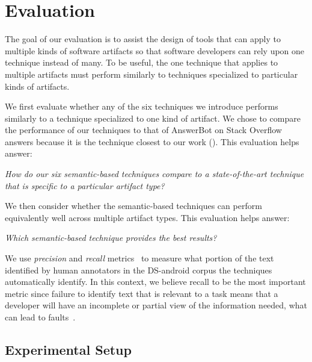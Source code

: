 \clearpage

\section{Evaluation}
\label{cp5:evaluation}



The goal of our evaluation is to assist the design of tools that
can apply to multiple kinds of software artifacts
so that software developers can rely upon
one technique instead of many. To be useful, the one technique
that applies to multiple artifacts must 
perform similarly to techniques specialized
to particular kinds of artifacts.


We first evaluate whether any of the
six techniques we introduce performs
similarly to a technique specialized to one
kind of artifact. We chose to compare
the performance of our techniques to
that of AnswerBot on Stack Overflow
answers because it is the technique closest to our work (). This
evaluation helps answer: 


\medskip
\begin{bluequote}
    \textit{How do our six semantic-based techniques compare to a state-of-the-art technique that is specific to a particular artifact type?} 
\end{bluequote}





We then consider whether the semantic-based
techniques can perform equivalently well across
multiple artifact types.
This evaluation helps answer:

\medskip
\begin{bluequote}
    \textit{Which semantic-based technique provides the best results?} 
\end{bluequote}





We use \textit{precision} and \textit{recall} metrics~\cite{manning2010IR} to measure what portion of the text identified by human annotators in the \acs{DS-android} corpus the techniques automatically identify.
In this context, we believe recall to be the most important metric since failure to identify text that is relevant to a task means that a developer will have an incomplete or partial view of the information needed,
what can lead to faults~\cite{Murphy2005}.




\subsection{Experimental Setup}

